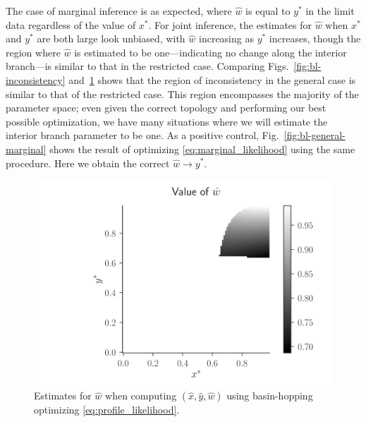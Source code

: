 \documentclass{article}
\begin{document}
The case of marginal inference is as expected, where $\hat{w}$ is equal to $y^*$ in the limit data regardless of the value of $x^*$.
For joint inference, the estimates for $\hat{w}$ when $x^*$ and $y^*$ are both large look unbiased, with $\hat{w}$ increasing as $y^*$ increases, though the region where $\hat{w}$ is estimated to be one---indicating no change along the interior branch---is similar to that in the restricted case.
Comparing Figs.~\ref{fig:bl-inconsistency} and~\ref{fig:bl-general-inconsistency} shows that the region of inconsistency in the general case is similar to that of the restricted case.
This region encompasses the majority of the parameter space; even given the correct topology and performing our best possible optimization, we have many situations where we will estimate the interior branch parameter to be one.
As a positive control, Fig.~\ref{fig:bl-general-marginal} shows the result of optimizing \eqref{eq:marginal_likelihood} using the same procedure.
Here we obtain the correct $\hat{w}\rightarrow y^*$.

\begin{figure}
\centering
\includegraphics[width=\textwidth]{w-hat-empirical-01}
\caption{
    Estimates for $\hat{w}$ when computing $(\hat{x}, \hat{y}, \hat{w})$ using basin-hopping \cite{Wales1997} optimizing \eqref{eq:profile_likelihood}.
}
\label{fig:bl-general-inconsistency}
\end{figure}
\end{document}
